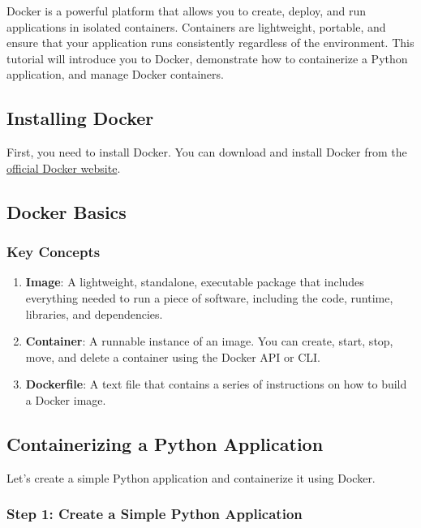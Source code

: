 \documentclass[
  letterpaper,
  DIV=11,
  numbers=noendperiod]{scrreprt}
\providecommand{\tightlist}{%
  \setlength{\itemsep}{0pt}\setlength{\parskip}{0pt}}\usepackage{longtable,booktabs,array}
\begin{document}
Docker is a powerful platform that allows you to create, deploy, and run
applications in isolated containers. Containers are lightweight,
portable, and ensure that your application runs consistently regardless
of the environment. This tutorial will introduce you to Docker,
demonstrate how to containerize a Python application, and manage Docker
containers.

\subsection{Installing Docker}\label{installing-docker-1}

First, you need to install Docker. You can download and install Docker
from the \href{https://www.docker.com/products/docker-desktop}{official
Docker website}.

\subsection{Docker Basics}\label{docker-basics-1}

\subsubsection{Key Concepts}\label{key-concepts-2}

\begin{enumerate}
\def\labelenumi{\arabic{enumi}.}
\tightlist
\item
  \textbf{Image}: A lightweight, standalone, executable package that
  includes everything needed to run a piece of software, including the
  code, runtime, libraries, and dependencies.
\item
  \textbf{Container}: A runnable instance of an image. You can create,
  start, stop, move, and delete a container using the Docker API or CLI.
\item
  \textbf{Dockerfile}: A text file that contains a series of
  instructions on how to build a Docker image.
\end{enumerate}

\subsection{Containerizing a Python
Application}\label{containerizing-a-python-application-1}

Let's create a simple Python application and containerize it using
Docker.

\subsubsection{Step 1: Create a Simple Python
Application}\label{step-1-create-a-simple-python-application-1}
\end{document}
